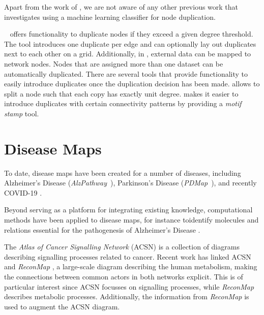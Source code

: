 \documentclass[
	fontsize=10pt, %
	twoside=true, %
	secnumdepth=1, %
  toc=indentunnumbered %
]{kaobook}
\begin{document}
Apart from the work of \citeauthor{nielsen_MachineLearningSupport_2019}, we are
not aware of any other previous work that investigates using a machine learning
classifier for node duplication.


~\cite{rohn_VANTEDV2Framework_2012} offers functionality to
duplicate nodes if they exceed a given degree threshold. The tool introduces one
duplicate per edge and can optionally lay out duplicates next to each other on a grid.
Additionally, in , external data can be mapped to network nodes.
Nodes that are assigned more than one dataset can be automatically duplicated.
%
There are several tools that provide functionality to easily introduce
duplicates once the duplication decision has been made. 
\cite{villeger_ArcadiaVisualizationTool_2010} allows to split a node such that
each copy has exactly unit degree. 
\cite{droste_OmixVisualizationTool_2013} makes it easier to introduce duplicates
with certain connectivity patterns by providing a \textit{motif stamp} tool.


\section{Disease Maps}
To date, disease maps have been created for a number of diseases, including
Alzheimer's Disease (\textit{AlzPathway}~\cite{ogishima_AlzPathwayUpdatedMap_2016}),
Parkinson's Disease (\textit{PDMap}~\cite{fujita_IntegratingPathwaysParkinson_2014}),
and recently \textsc{COVID-19}
\cite{ostaszewski_COVID19DiseaseMap_2020}.

Beyond serving as a platform for integrating existing knowledge, computational
methods have been applied to disease maps, for instance toidentify molecules and
relations essential for the pathogenesis of Alzheimer's Disease
\cite{mizuno_NetworkAnalysisComprehensive_2016}.

The \textit{Atlas of Cancer Signalling Network} (ACSN)
\cite{kuperstein_AtlasCancerSignalling_2015} is a collection of diagrams
describing signalling processes related to cancer. Recent work
\cite{sompairac_metabolic_2019} has linked ACSN and \textit{ReconMap}
\cite{noronha_ReconMapInteractiveVisualization_2017}, a
large-scale diagram describing the human metabolism, making
the connections between common actors in both networks explicit. This is of
particular interest since ACSN focusses on signalling processes, while
\textit{ReconMap} describes metabolic processes.
Additionally, the information from \textit{ReconMap} is used to augment the ACSN diagram.
\end{document}
